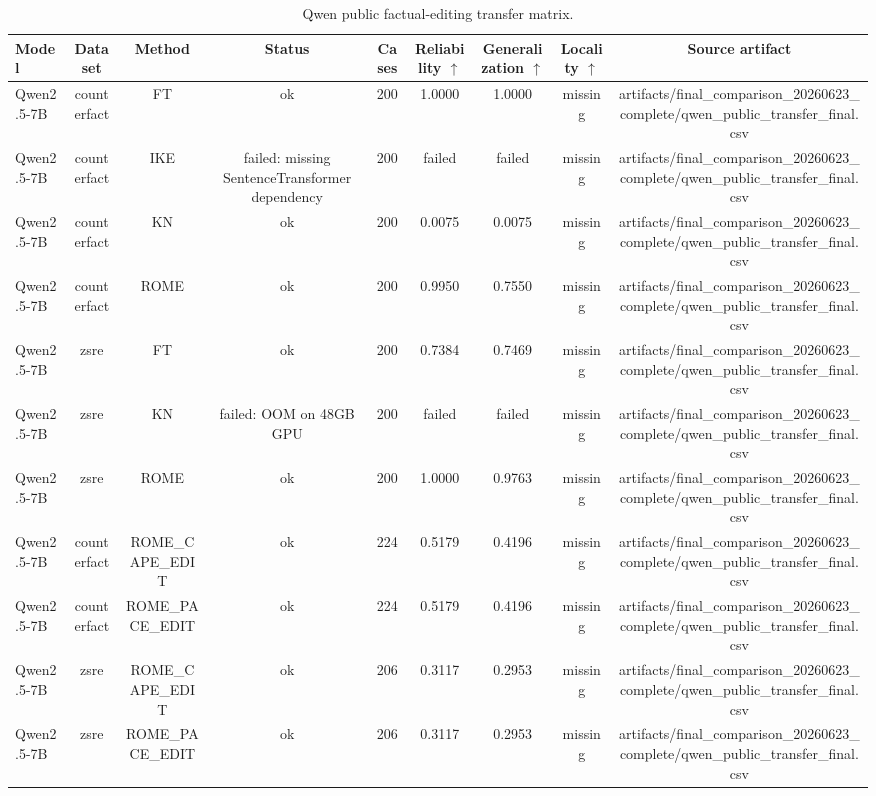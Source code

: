 \begin{table}[t]
\centering
\scriptsize
\caption{Qwen public factual-editing transfer matrix.}
\label{tab:qwen-public-transfer}
\begin{tabular}{lcccccccc}
\toprule
Model & Dataset & Method & Status & Cases & Reliability $\uparrow$ & Generalization $\uparrow$ & Locality $\uparrow$ & Source artifact \\
\midrule
Qwen2.5-7B & counterfact & FT & ok & 200 & 1.0000 & 1.0000 & missing & artifacts/final\_comparison\_20260623\_complete/qwen\_public\_transfer\_final.csv \\
Qwen2.5-7B & counterfact & IKE & failed: missing SentenceTransformer dependency & 200 & failed & failed & missing & artifacts/final\_comparison\_20260623\_complete/qwen\_public\_transfer\_final.csv \\
Qwen2.5-7B & counterfact & KN & ok & 200 & 0.0075 & 0.0075 & missing & artifacts/final\_comparison\_20260623\_complete/qwen\_public\_transfer\_final.csv \\
Qwen2.5-7B & counterfact & ROME & ok & 200 & 0.9950 & 0.7550 & missing & artifacts/final\_comparison\_20260623\_complete/qwen\_public\_transfer\_final.csv \\
Qwen2.5-7B & zsre & FT & ok & 200 & 0.7384 & 0.7469 & missing & artifacts/final\_comparison\_20260623\_complete/qwen\_public\_transfer\_final.csv \\
Qwen2.5-7B & zsre & KN & failed: OOM on 48GB GPU & 200 & failed & failed & missing & artifacts/final\_comparison\_20260623\_complete/qwen\_public\_transfer\_final.csv \\
Qwen2.5-7B & zsre & ROME & ok & 200 & 1.0000 & 0.9763 & missing & artifacts/final\_comparison\_20260623\_complete/qwen\_public\_transfer\_final.csv \\
Qwen2.5-7B & counterfact & ROME\_CAPE\_EDIT & ok & 224 & 0.5179 & 0.4196 & missing & artifacts/final\_comparison\_20260623\_complete/qwen\_public\_transfer\_final.csv \\
Qwen2.5-7B & counterfact & ROME\_PACE\_EDIT & ok & 224 & 0.5179 & 0.4196 & missing & artifacts/final\_comparison\_20260623\_complete/qwen\_public\_transfer\_final.csv \\
Qwen2.5-7B & zsre & ROME\_CAPE\_EDIT & ok & 206 & 0.3117 & 0.2953 & missing & artifacts/final\_comparison\_20260623\_complete/qwen\_public\_transfer\_final.csv \\
Qwen2.5-7B & zsre & ROME\_PACE\_EDIT & ok & 206 & 0.3117 & 0.2953 & missing & artifacts/final\_comparison\_20260623\_complete/qwen\_public\_transfer\_final.csv \\
\bottomrule
\end{tabular}
\end{table}
